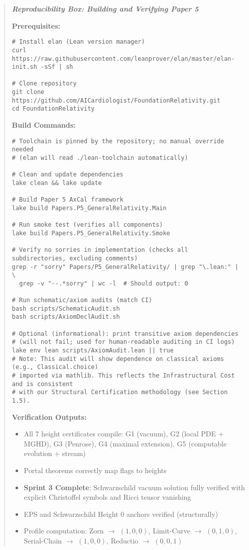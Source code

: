 \documentclass[11pt]{article}
\newenvironment{mdframed}[1][]{\begin{quote}\itshape}{\end{quote}}
\theoremstyle{definition}
\theoremstyle{remark}
\begin{document}
\begin{mdframed}[backgroundcolor=blue!5, linecolor=blue!30, linewidth=0.8pt]
\textbf{Reproducibility Box: Building and Verifying Paper 5}

\noindent\textbf{Prerequisites:}
\begin{verbatim}
# Install elan (Lean version manager)
curl https://raw.githubusercontent.com/leanprover/elan/master/elan-init.sh -sSf | sh

# Clone repository
git clone https://github.com/AICardiologist/FoundationRelativity.git
cd FoundationRelativity
\end{verbatim}

\noindent\textbf{Build Commands:}
\begin{verbatim}
# Toolchain is pinned by the repository; no manual override needed
# (elan will read ./lean-toolchain automatically)

# Clean and update dependencies
lake clean && lake update

# Build Paper 5 AxCal framework
lake build Papers.P5_GeneralRelativity.Main

# Run smoke test (verifies all components)
lake build Papers.P5_GeneralRelativity.Smoke

# Verify no sorries in implementation (checks all subdirectories, excluding comments)
grep -r "sorry" Papers/P5_GeneralRelativity/ | grep "\.lean:" | \
  grep -v "--.*sorry" | wc -l  # Should output: 0

# Run schematic/axiom audits (match CI)
bash scripts/SchematicAudit.sh
bash scripts/AxiomDeclAudit.sh

# Optional (informational): print transitive axiom dependencies
# (will not fail; used for human-readable auditing in CI logs)
lake env lean scripts/AxiomAudit.lean || true
# Note: This audit will show dependence on classical axioms (e.g., Classical.choice)
# imported via mathlib. This reflects the Infrastructural Cost and is consistent 
# with our Structural Certification methodology (see Section 1.5).
\end{verbatim}

\noindent\textbf{Verification Outputs:}
\begin{itemize}
\item All 7 height certificates compile: G1 (vacuum), G2 (local PDE + MGHD), G3 (Penrose), G4 (maximal extension), G5 (computable evolution + stream)
\item Portal theorems correctly map flags to heights
\item \textbf{Sprint 3 Complete}: Schwarzschild vacuum solution fully verified with explicit Christoffel symbols and Ricci tensor vanishing
\item EPS and Schwarzschild Height 0 anchors verified (structurally)
\item Profile computation: Zorn $\to$ $(1,0,0)$, Limit-Curve $\to$ $(0,1,0)$, Serial-Chain $\to$ $(1,0,0)$, Reductio $\to$ $(0,0,1)$
\end{itemize}
\end{mdframed}
\end{document}
